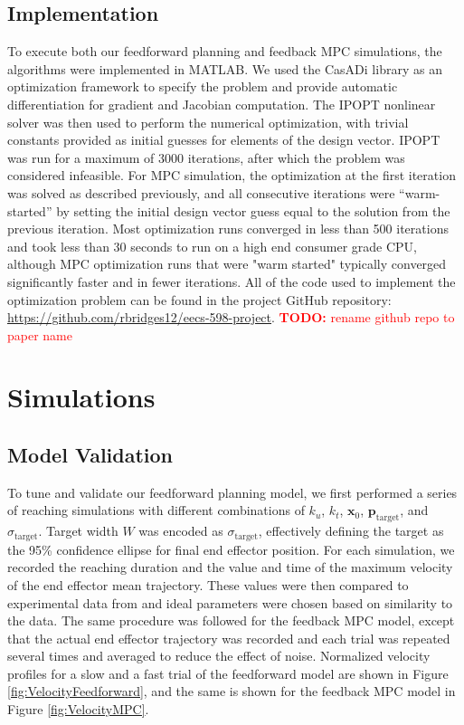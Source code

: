 \documentclass[letterpaper, 10pt, conference]{ieeeconf}
\newcommand{\todo}[1]{\textcolor{red}{\textbf{TODO:} #1}}
\begin{document}
\subsection{Implementation}
To execute both our feedforward planning and feedback MPC simulations, the algorithms were implemented in MATLAB. 
We used the CasADi library \cite{casadi} as an optimization framework to specify the problem and provide automatic differentiation for gradient and Jacobian computation. The IPOPT nonlinear solver was then used to perform the numerical optimization, with trivial constants provided as initial guesses for elements of the design vector. 
IPOPT was run for a maximum of 3000 iterations, after which the problem was considered infeasible. For MPC simulation, the optimization at the first iteration was solved as described previously, and all consecutive iterations were ``warm-started'' by setting the initial design vector guess equal to the solution from the previous iteration. Most optimization runs converged in less than 500 iterations and took less than 30 seconds to run on a high end consumer grade CPU, although MPC optimization runs that were "warm started" typically converged significantly faster and in fewer iterations. All of the code used to implement the optimization problem can be found in the project GitHub repository: \href{https://github.com/rbridges12/eecs-598-project}{https://github.com/rbridges12/eecs-598-project}. \todo{rename github repo to paper name}

\section{Simulations}
\subsection{Model Validation}

To tune and validate our feedforward planning model, we first performed a series of reaching simulations with different combinations of $k_u$, $k_t$, $\mathbf{x}_0$, $\mathbf{p}_{\text{target}}$, and $\sigma_{\text{target}}$. Target width $W$ was encoded as $\sigma_{\text{target}}$, effectively defining the target as the 95\% confidence ellipse for final end effector position. For each simulation, we recorded the reaching duration and the value and time of the maximum velocity of the end effector mean trajectory. These values were then compared to experimental data from \cite{fitts_law_exp_data} and ideal parameters were chosen based on similarity to the data. The same procedure was followed for the feedback MPC model, except that the actual end effector trajectory was recorded and each trial was repeated several times and averaged to reduce the effect of noise.
Normalized velocity profiles for a slow and a fast trial of the feedforward model are shown in Figure \ref{fig:VelocityFeedforward}, and the same is shown for the feedback MPC model in Figure \ref{fig:VelocityMPC}.
\end{document}
